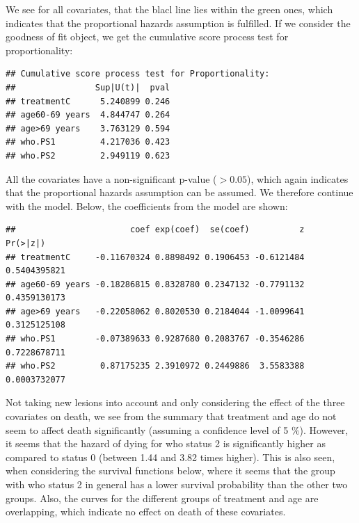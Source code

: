 \documentclass[
  11pt,
]{article}
\newenvironment{Shaded}{\begin{snugshade}}{\end{snugshade}}
\newcommand{\FunctionTok}[1]{\textcolor[rgb]{0.00,0.00,0.00}{#1}}
\newcommand{\NormalTok}[1]{#1}
\newcommand{\SpecialCharTok}[1]{\textcolor[rgb]{0.00,0.00,0.00}{#1}}
\begin{document}
We see for all covariates, that the blacl line lies within the green
ones, which indicates that the proportional hazards assumption is
fulfilled. If we consider the goodness of fit object, we get the
cumulative score process test for proportionality:

\begin{verbatim}
## Cumulative score process test for Proportionality:
##                Sup|U(t)|  pval
## treatmentC      5.240899 0.246
## age60-69 years  4.844747 0.264
## age>69 years    3.763129 0.594
## who.PS1         4.217036 0.423
## who.PS2         2.949119 0.623
\end{verbatim}

All the covariates have a non-significant p-value (\(>0.05\)), which
again indicates that the proportional hazards assumption can be assumed.
We therefore continue with the model. Below, the coefficients from the
model are shown:

\begin{Shaded}
\end{Shaded}

\begin{verbatim}
##                       coef exp(coef)  se(coef)          z     Pr(>|z|)
## treatmentC     -0.11670324 0.8898492 0.1906453 -0.6121484 0.5404395821
## age60-69 years -0.18286815 0.8328780 0.2347132 -0.7791132 0.4359130173
## age>69 years   -0.22058062 0.8020530 0.2184044 -1.0099641 0.3125125108
## who.PS1        -0.07389633 0.9287680 0.2083767 -0.3546286 0.7228678711
## who.PS2         0.87175235 2.3910972 0.2449886  3.5583388 0.0003732077
\end{verbatim}

Not taking new lesions into account and only considering the effect of
the three covariates on death, we see from the summary that treatment
and age do not seem to affect death significantly (assuming a confidence
level of 5 \(\%\)). However, it seems that the hazard of dying for who
status 2 is significantly higher as compared to status 0 (between 1.44
and 3.82 times higher). This is also seen, when considering the survival
functions below, where it seems that the group with who status 2 in
general has a lower survival probability than the other two groups.
Also, the curves for the different groups of treatment and age are
overlapping, which indicate no effect on death of these covariates.
\end{document}
